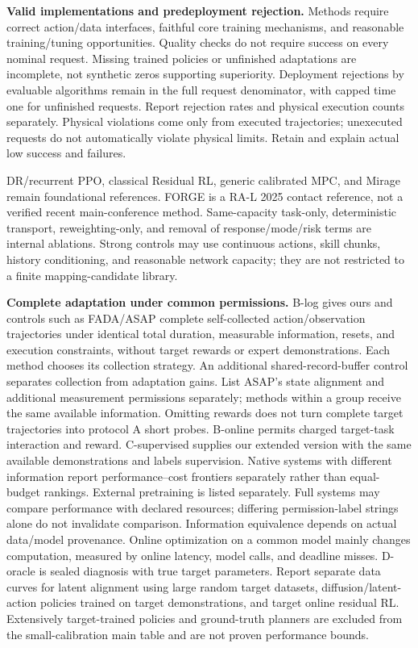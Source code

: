\textbf{Valid implementations and predeployment rejection.} Methods require correct
action/data interfaces, faithful core training mechanisms, and reasonable training/tuning
opportunities. Quality checks do not require success on every nominal request. Missing
trained policies or unfinished adaptations are incomplete, not synthetic zeros supporting
superiority. Deployment rejections by evaluable algorithms remain in the full request
denominator, with capped time one for unfinished requests. Report rejection rates and
physical execution counts separately. Physical violations come only from executed
trajectories; unexecuted requests do not automatically violate physical limits. Retain
and explain actual low success and failures.

DR/recurrent PPO, classical Residual RL, generic calibrated MPC, and Mirage remain
foundational references\cite{dr,ppo,rppo,residualrl,mjpc,mirage}. FORGE is a RA-L 2025
contact reference, not a verified recent main-conference method\cite{forge}.
Same-capacity task-only, deterministic transport, reweighting-only, and removal of
response/mode/risk terms are internal ablations. Strong controls may use continuous
actions, skill chunks, history conditioning, and reasonable network capacity; they
are not restricted to a finite mapping-candidate library.

\textbf{Complete adaptation under common permissions.} B-log gives ours and controls
such as FADA/ASAP complete self-collected action/observation trajectories under identical
total duration, measurable information, resets, and execution constraints, without
target rewards or expert demonstrations. Each method chooses its collection strategy.
An additional shared-record-buffer control separates collection from adaptation gains.
List ASAP's state alignment and additional measurement permissions separately; methods
within a group receive the same available information. Omitting rewards does not turn
complete target trajectories into protocol A short probes. B-online permits charged
target-task interaction and reward. C-supervised supplies our extended version with
the same available demonstrations and labels supervision. Native systems with different
information report performance--cost frontiers separately rather than equal-budget
rankings. External pretraining is listed separately. Full systems may compare performance
with declared resources; differing permission-label strings alone do not invalidate
comparison. Information equivalence depends on actual data/model provenance. Online
optimization on a common model mainly changes computation, measured by online latency,
model calls, and deadline misses. D-oracle is sealed diagnosis with true target parameters.
Report separate data curves for latent alignment using large random target datasets,
diffusion/latent-action policies trained on target demonstrations, and target online
residual RL\cite{lsa,lad}. Extensively target-trained policies and ground-truth planners
are excluded from the small-calibration main table and are not proven performance bounds.

